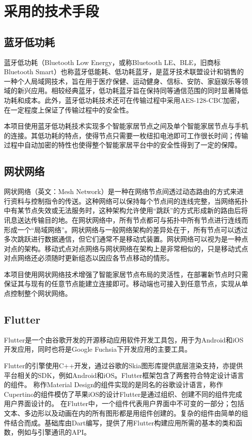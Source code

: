 \chapter{采用的技术手段}

\section{蓝牙低功耗}
蓝牙低功耗（Bluetooth Low Energy，或称Bluetooth LE、BLE，旧商标Bluetooth Smart）也称蓝牙低能耗、低功耗蓝牙，是蓝牙技术联盟设计和销售的一种个人局域网技术，旨在用于医疗保健、运动健身、信标、安防、家庭娱乐等领域的新兴应用。相较经典蓝牙，低功耗蓝牙旨在保持同等通信范围的同时显著降低功耗和成本。\cite{ble}此外，蓝牙低功耗技术还可在传输过程中采用AES-128-CBC加密，在一定程度上保证了传输过程中的安全性。

本项目使用蓝牙低功耗技术实现多个智能家居节点之间及单个智能家居节点与手机的连接。其低功耗的特点，使得节点只需要一枚纽扣电池即可工作很长时间；传输过程中自动加密的特性也使得整个智能家居平台中的安全性得到了一定的保障。

\section{网状网络}
网状网络（英文：Mesh Network）是一种在网络节点间透过动态路由的方式来进行资料与控制指令的传送。这种网络可以保持每个节点间的连线完整，当网络拓扑中有某节点失效或无法服务时，这种架构允许使用“跳跃”的方式形成新的路由后将讯息送达传输目的地。在网状网络中，所有节点都可与拓扑中所有节点进行连线而形成一个“局域网络”。网状网络与一般网络架构的差异处在于，所有节点可以透过多次跳跃进行数据通信，但它们通常不是移动式装置。网状网络可以视为是一种点对点的架构。移动式点对点网络与网状网络在架构上是非常相似的，只是移动式点对点网络还必须随时更新组态以因应各节点移动的情形。\cite{mesh}

本项目使用网状网络技术增强了智能家居节点布局的灵活性，在部署新节点时只需保证其与现有的任意节点能建立连接即可。移动端也可接入到任意节点，实现从单点控制整个网状网络。

\section{Flutter}
Flutter是一个由谷歌开发的开源移动应用软件开发工具包，用于为Android和iOS开发应用，同时也将是Google Fuchsia下开发应用的主要工具。\cite{flutter}

Flutter的引擎使用C++开发，通过谷歌的Skia图形库提供底层渲染支持，亦提供平台相关的SDK，例如Android和iOS。Flutter框架包含了两套符合特定设计语言的组件。 称作Material Design的组件实现的是同名的谷歌设计语言，称作Cupertino的组件模仿了苹果iOS的设计Flutter是通过组织、创建不同的组件完成用户界面设计的。 在Flutter中，一个组件代表用户界面中不可变的一部分；包括文本、多边形以及动画在内的所有图形都是用组件创建的。复杂的组件由简单的组件结合而成。基础库由Dart编写，提供了用Flutter构建应用所需的基本的类和函数，例如与引擎通讯的API。\cite{flutter}

